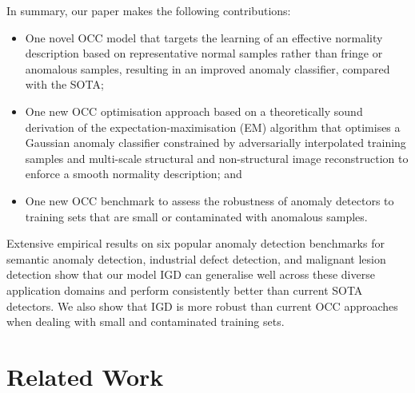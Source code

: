\documentclass[letterpaper]{article} \usepackage{aaai22}  \usepackage{times}  \usepackage{helvet}  \usepackage{courier}  \usepackage[hyphens]{url}  \usepackage{graphicx} \urlstyle{rm} \def\UrlFont{\rm}  \usepackage{natbib}  \usepackage{caption} \DeclareCaptionStyle{ruled}{labelfont=normalfont,labelsep=colon,strut=off} \frenchspacing  \setlength{\pdfpagewidth}{8.5in}  \setlength{\pdfpageheight}{11in}  \usepackage{algorithm}
\begin{document}
In summary, our paper makes the following contributions:
\begin{itemize}
     \item One novel OCC model that targets the learning of an effective normality description based on representative normal samples rather than fringe or anomalous samples, resulting in an improved anomaly classifier, compared with the SOTA; 
     \item One new OCC optimisation approach based on a theoretically sound derivation of the expectation-maximisation (EM) algorithm that optimises a Gaussian anomaly classifier constrained by adversarially interpolated training samples and multi-scale structural and non-structural image reconstruction to enforce a smooth normality description; and
     \item One new OCC benchmark to assess the robustness of anomaly detectors to training sets that are small or contaminated with anomalous samples.
\end{itemize}
Extensive empirical results on six popular anomaly detection benchmarks for semantic anomaly detection, industrial defect detection,
and malignant lesion detection show that our model IGD
can generalise well across these diverse application domains and perform consistently better than current SOTA detectors. We also show that IGD is more robust than current OCC approaches
when dealing with small and contaminated training sets.


\section{Related Work}
\end{document}
